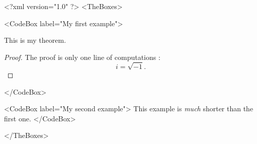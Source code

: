 <?xml version="1.0" ?>
<TheBoxes>

<CodeBox label="My first example">
	
\begin{proposition}
	This is my theorem.
\end{proposition}

\begin{proof}
	The proof is only one line of computations :
	\begin{equation}
		i=\sqrt{-1}.
	\end{equation}
\end{proof}

</CodeBox>

<CodeBox label="My second example">
	This example is \emph{much} shorter than the first one.
</CodeBox>

</TheBoxes>
